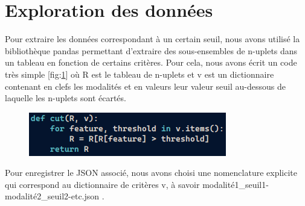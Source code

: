 \section{Exploration des données}
  Pour extraire les données correspondant à un certain seuil, nous avons utilisé la bibliothèque pandas permettant d'extraire des sous-ensembles de n-uplets dans un tableau en fonction de certains critères.
  Pour cela, nous avons écrit un code très simple [fig:\ref{fig:code_cut}] où R est le tableau de n-uplets et v est un dictionnaire contenant en clefs les modalités et en valeurs leur valeur seuil au-dessous de laquelle les n-uplets sont écartés.

\begin{figure}[H]
  \centering
  \includegraphics[scale=1]{images/code_cut.png}
  \caption{}
  \label{fig:code_cut}
\end{figure}

Pour enregistrer le JSON associé, nous avons choisi une nomenclature explicite qui correspond au dictionnaire de critères v, à savoir modalité1\_seuil1-modalité2\_seuil2-etc.json .
